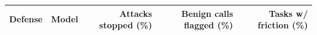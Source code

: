 \begin{tabular}{@{}llrrr@{}}
\toprule
Defense & Model & Attacks stopped (\%) & Benign calls flagged (\%) & Tasks w/ friction (\%) \\
\midrule

\bottomrule
\end{tabular}
